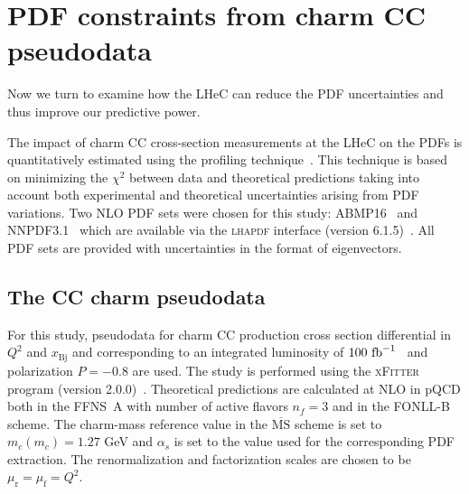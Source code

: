 \documentclass[pdftex,twocolumn,epjc3]{svjour3}          %
\newcommand{\abmp} {ABMP16\xspace}
\newcommand{\nnpdf} {NNPDF3.1\xspace}
\newcommand{\chisq}{\ensuremath{\chi^2}\xspace}
\newcommand{\xfitter} {\textsc{xFitter}\xspace}
\newcommand{\lhapdf} {{\textsc{lhapdf}}\xspace}
\newcommand{\xbj}{\ensuremath{x_{\text{Bj}}}\xspace}
\newcommand{\fonll} {{FONLL-B}\xspace}
\newcommand{\ffns} {{FFNS~A}\xspace}
\begin{document}
\section{PDF constraints from charm CC pseudodata}
\label{sec:PDF}

Now we turn to examine how the LHeC can reduce the PDF uncertainties
and thus improve our predictive power.

The impact of charm CC cross-section measurements at the LHeC on the
PDFs is quantitatively estimated using the profiling
technique~\cite{Paukkunen:2014zia}. This technique is based on
minimizing the \chisq between data and theoretical predictions taking
into account both experimental and theoretical uncertainties arising
from PDF variations. Two NLO PDF sets were chosen for this study:
\abmp~\cite{Alekhin:2018pai} and \nnpdf~\cite{Ball:2017nwa} which are
available via the \lhapdf interface (version
6.1.5)~\cite{Buckley:2014ana}. All PDF sets are provided with
uncertainties in the format of eigenvectors.

\subsection{The CC  charm pseudodata}
\label{sec:pseudodata}

For this study, pseudodata for charm CC production cross section
differential in $Q^2$ and \xbj and corresponding to an integrated
luminosity of $100{\rm~fb}^{-1}$~\cite{AbelleiraFernandez:2012cc,Blumlein:1992we} and
polarization $P=-0.8$ are used.
%
%
The study is performed using the \xfitter program (version
2.0.0)~\cite{Alekhin:2014irh}. Theoretical predictions are calculated at NLO
in pQCD both in the \ffns with number of active flavors $n_f = 3$ and
in the \fonll scheme. The charm-mass reference value in the
$\overline{\mbox{MS}}$ scheme is set to $m_c(m_c) = 1.27$ GeV and
$\alpha_s$ is set to the value used for the corresponding PDF
extraction. The renormalization and factorization scales are chosen to
be $\mu_\mathrm{r} = \mu_\mathrm{f} = Q^2$.
\end{document}

